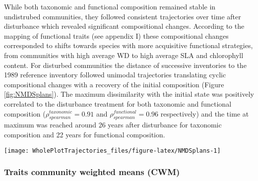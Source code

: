 \documentclass[fleqn,10pt]{ArtEcoFoG} %
\theoremstyle{definition}
\theoremstyle{definition}
\theoremstyle{definition}
\theoremstyle{remark}
\begin{document}
While both taxonomic and functional composition remained stable in
undistrubed communities, they followed consistent trajectories over time
after disturbance which revealed significant compositional changes.
According to the mapping of functional traits (see appendix I) these
compositional changes corresponded to shifts towards species with more
acquisitive functional strategies, from communities with high average WD
to high average SLA and chlorophyll content. For disturbed communities
the distance of successive inventories to the 1989 reference inventory
followed unimodal trajectories translating cyclic compositional changes
with a recovery of the initial composition (Figure \ref{fig:NMDSplans}).
The maximum dissimilarity with the initial state was positively
correlated to the disturbance treatment for both taxonomic and
functional composition (\(\rho_{spearman}^{taxonomic}=0.91\) and
\(\rho_{spearman}^{functional}=0.96\) respectively) and the time at
maximum was reached around 26 years after disturbance for taxonomic
composition and 22 years for functional composition.

\begin{figure*}

{\centering \texttt{[image: WholePlotTrajectories\_files/figure-latex/NMDSplans-1]} 

}

\caption{Trajectories of the plots in terms of flora composition (left panels \textbf{(a)} and \textbf{(c)}) and functional composition (right panels \textbf{(b)} and \textbf{(d)}) regarding the 6 leaf and stem functional traits, the maximum allometric height and seed mass class. Plots trajectories are first represented in the two-dimensional space from the NMDS performed for the 30 years after disturbance based on Bray-Curtis dissimilarity measures between successive inventories (Upper panels \textbf{(a)} and \textbf{(b)}). Then the lower panels (\textbf{(c)} and \textbf{(d)}) represent the euclidean distance to initial condition along the 30 sampled years. Line colors represent the disturbance treatment (green for control, blue for T1,orange for T2 and red for T3). The 0.025 and 0.975 percentile correspond to the variance observed for 50 iteration of the taxonomic uncertainty propagation and functional trait filling processes.}\label{fig:NMDSplans}
\end{figure*}

\subsubsection{Traits community weighted means
(CWM)}\label{traits-community-weighted-means-cwm}
\end{document}
